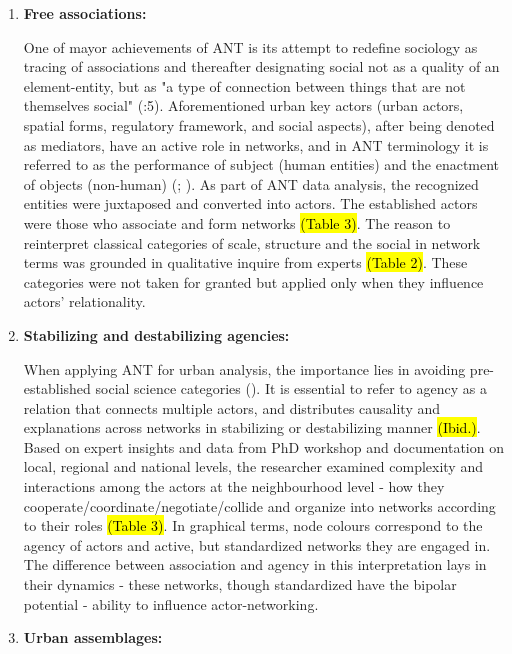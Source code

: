 \documentclass[11pt]{report}
\begin{document}
\begin{enumerate}
\item \textbf{Free associations:}

One of mayor achievements of ANT is its attempt to redefine sociology as tracing of associations and thereafter designating social not as a quality of an element-entity, but as "a type of connection between things that are not themselves social" (\cite{Latour 2005}:5).
Aforementioned urban key actors (urban actors, spatial forms, regulatory framework, and social aspects), after being denoted as mediators, have an active role in networks, and in ANT terminology it is referred to as the performance of subject (human entities) and the enactment of objects (non-human) (\cite{Farias 2011}; \cite{Callon 1986}). As part of ANT data analysis, the recognized entities were juxtaposed and converted into actors. The established actors were those who associate and form networks \hl{(Table 3)}. The reason to reinterpret classical categories of scale, structure and the social in network terms was grounded in qualitative inquire from experts \hl{(Table 2)}. These categories were not taken for granted but applied only when they influence actors’ relationality.

\item \textbf{Stabilizing and destabilizing agencies:}

When applying ANT for urban analysis, the importance lies in avoiding pre-established social science categories (\cite{Farias 2011}). It is essential to refer to agency as a relation that connects multiple actors, and distributes causality and explanations across networks in stabilizing or destabilizing manner \hl{(Ibid.)}. 
Based on expert insights and data from PhD workshop and documentation on local, regional and national levels, the researcher examined complexity and interactions among the actors at the neighbourhood level - how they cooperate/coordinate/negotiate/collide and organize into networks according to their roles \hl{(Table 3)}. In graphical terms, node colours correspond to the agency of actors and active, but standardized networks they are engaged in. The difference between association and agency in this interpretation lays in their dynamics - these networks, though standardized have the bipolar potential - ability to influence actor-networking.

\item \textbf{Urban assemblages:}


\end{enumerate}
\end{document}
